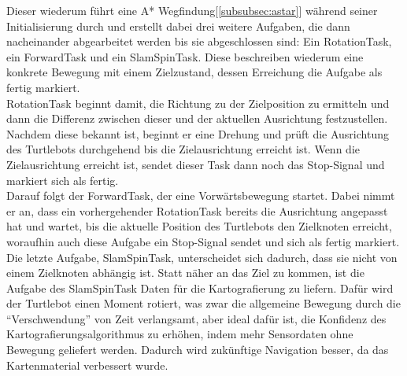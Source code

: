 Dieser wiederum führt eine A* Wegfindung[\ref{subsubsec:astar}] während seiner Initialisierung durch und erstellt dabei
drei weitere Aufgaben, die dann nacheinander abgearbeitet werden bis sie abgeschlossen sind: Ein RotationTask,
ein ForwardTask und ein SlamSpinTask.
Diese beschreiben wiederum eine konkrete Bewegung mit einem Zielzustand, dessen Erreichung die Aufgabe als fertig markiert.\\

RotationTask beginnt damit, die Richtung zu der Zielposition zu ermitteln und dann die Differenz zwischen dieser und der
aktuellen Ausrichtung festzustellen.
Nachdem diese bekannt ist, beginnt er eine Drehung und prüft die Ausrichtung des Turtlebots durchgehend bis die
Zielausrichtung erreicht ist.
Wenn die Zielausrichtung erreicht ist, sendet dieser Task dann noch das Stop-Signal und markiert sich als fertig.\\

Darauf folgt der ForwardTask, der eine Vorwärtsbewegung startet.
Dabei nimmt er an, dass ein vorhergehender RotationTask bereits die Ausrichtung angepasst hat und wartet, bis die
aktuelle Position des Turtlebots den Zielknoten erreicht, woraufhin auch diese Aufgabe ein Stop-Signal sendet und sich
als fertig markiert.\\

Die letzte Aufgabe, SlamSpinTask, unterscheidet sich dadurch, dass sie nicht von einem Zielknoten abhängig ist.
Statt näher an das Ziel zu kommen, ist die Aufgabe des SlamSpinTask Daten für die Kartografierung zu liefern.
Dafür wird der Turtlebot einen Moment rotiert, was zwar die allgemeine Bewegung durch die ``Verschwendung'' von Zeit
verlangsamt, aber ideal dafür ist, die Konfidenz des Kartografierungsalgorithmus zu erhöhen, indem mehr Sensordaten ohne
Bewegung geliefert werden.
Dadurch wird zukünftige Navigation besser, da das Kartenmaterial verbessert wurde.

